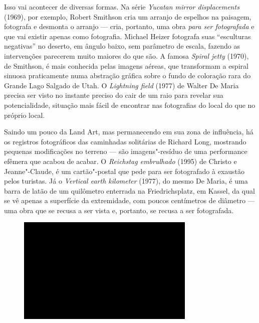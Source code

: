 Isso vai acontecer de diversas formas. Na série \emph{Yucatan mirror
displacements} (1969), por exemplo, Robert Smithson cria um arranjo de
espelhos na paisagem, fotografa e desmonta o arranjo --- cria, portanto,
uma obra \emph{para ser fotografada} e que vai existir apenas como
fotografia. Michael Heizer fotografa suas ``esculturas negativas'' no
deserto, em ângulo baixo, sem parâmetro de escala, fazendo as
intervenções parecerem muito maiores do que são. A famosa \emph{Spiral
jetty} (1970), de Smithson, é mais conhecida pelas imagens aéreas, que
transformam a espiral sinuosa praticamente numa abstração gráfica sobre
o fundo de coloração rara do Grande Lago Salgado de Utah. O
\emph{Lightning field} (1977) de Walter De Maria precisa ser visto no
instante preciso do cair de um raio para revelar sua potencialidade,
situação mais fácil de encontrar nas fotografias do local do que no
próprio local.

Saindo um pouco da Land Art, mas permanecendo em sua zona de influência,
há os registros fotográficos das caminhadas solitárias de Richard Long,
mostrando pequenas modificações no terreno --- são imagens"-resíduo de uma
performance efêmera que acabou de acabar. O \emph{Reichstag embrulhado}
(1995) de Christo e Jeanne"-Claude, é um cartão"-postal que pede para ser
fotografado à exaustão pelos turistas. Já o \emph{Vertical earth
kilometer} (1977), do mesmo De Maria, é uma barra de latão de um
quilômetro enterrada na Friedrichsplatz, em Kassel, da qual se vê apenas
a superfície da extremidade, com poucos centímetros de diâmetro --- uma
obra que se recusa a ser vista e, portanto, se recusa a ser fotografada.

\begin{figure}[!ht]
\centering
 \includegraphics[width=85mm]{./imgs/im1.jpg}
\caption{\tiny{}}
\end{figure}

